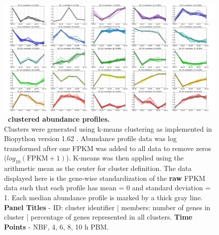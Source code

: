 
\begin{landscape}

    \begin{figure}[h]
    \centering
    \includegraphics[width=\linewidth]{figures/figs/ecr_and_insects_ptci_20130903/ecr_and_insects_ptci1_gene_profiles_from_cummerbund/25_clusters.pdf}
    \caption[\Ag\ clustered abundance profiles]{\sf \textbf{\Ag\ clustered abundance profiles.} \\ 
    Clusters were generated using k-means clustering as implemented in Biopython version 1.62 \cite{Cock2009}.  Abundance profile data was log transformed after one FPKM was added to all data to remove zeros ($log_{10}(\mathrm{FPKM}+1)$).  K-means was then applied using the arithmetic mean as the center for cluster definition.  The data displayed here is the gene-wise standardization of the \textbf{raw} FPKM data such that each profile has mean = 0 and standard deviation = 1. Each median abundance profile is marked by a thick gray line. \textbf{Panel Titles} - ID: cluster identifier | members: number of genes in cluster | percentage of genes represented in all clusters. \textbf{Time Points} - \gls{NBF}, 4, 6, 8, 10 h \gls{PBM}.
}
    \label{fig:25-clusters}
    \end{figure}
    
\end{landscape}

